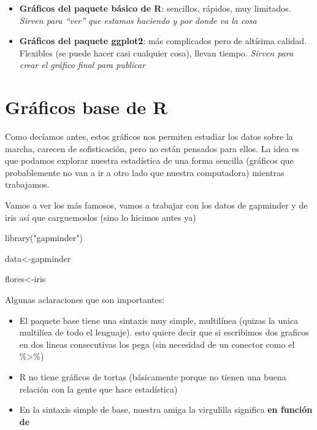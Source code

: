 \documentclass[
]{book}
\newenvironment{Shaded}{\begin{snugshade}}{\end{snugshade}}
\newcommand{\FunctionTok}[1]{\textcolor[rgb]{0.00,0.00,0.00}{#1}}
\newcommand{\NormalTok}[1]{#1}
\newcommand{\OtherTok}[1]{\textcolor[rgb]{0.56,0.35,0.01}{#1}}
\newcommand{\StringTok}[1]{\textcolor[rgb]{0.31,0.60,0.02}{#1}}
\begin{document}
\begin{itemize}
\item
  \textbf{Gráficos del paquete básico de R}: sencillos, rápidos, muy limitados. \emph{Sirven para ``ver'' que estamos haciendo y por donde va la cosa}
\item
  \textbf{Gráficos del paquete ggplot2}: más complicados pero de altísima calidad. Flexibles (se puede hacer casi cualquier cosa), llevan tiempo. \emph{Sirven para crear el gráfico final para publicar}
\end{itemize}

\hypertarget{gruxe1ficos-base-de-r}{%
\section{Gráficos base de R}\label{gruxe1ficos-base-de-r}}

Como decíamos antes, estos gráficos nos permiten estudiar los datos sobre la marcha, carecen de sofisticación, pero no están pensados para ellos.
La idea es que podamos explorar nuestra estadística de una forma sencilla (gráficos que probablemente no van a ir a otro lado que nuestra computadora) mientras trabajamos.

Vamos a ver los más famosos, vamos a trabajar con los datos de gapminder y de iris así que carguemoslos (sino lo hicimos antes ya)

\begin{Shaded}
\begin{Highlighting}[]
\FunctionTok{library}\NormalTok{(}\StringTok{"gapminder"}\NormalTok{)}

\NormalTok{data}\OtherTok{\textless{}{-}}\NormalTok{gapminder}

\NormalTok{flores}\OtherTok{\textless{}{-}}\NormalTok{iris}
\end{Highlighting}
\end{Shaded}

Algunas aclaraciones que son importantes:

\begin{itemize}
\item
  El paquete base tiene una sintaxis muy simple, multilínea (quizas la unica multilíea de todo el lenguaje). esto quiere decir que si escribimos dos graficos en dos lineas consecutivas los pega (sin necesidad de un conector como el \%\textgreater\%)
\item
  R no tiene gráficos de tortas (básicamente porque no tienen una buena relación con la gente que hace estadística)
\item
  En la sintaxis simple de base, nuestra amiga la virgulilla significa \textbf{en función de}
\end{itemize}
\end{document}
